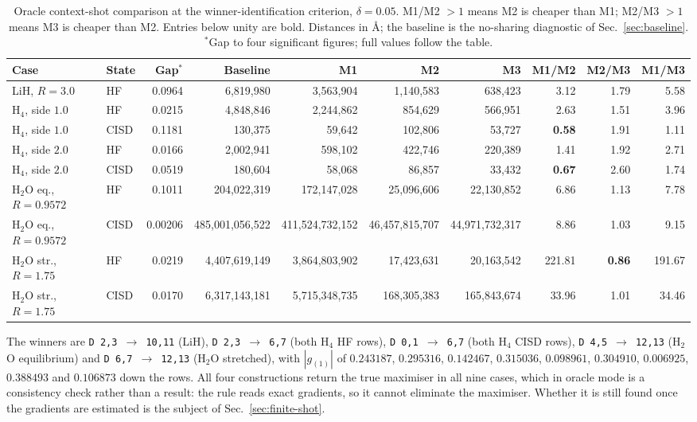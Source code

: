 \documentclass[10pt]{article}
\begin{document}
\begin{table}[!htbp]
\centering
\scriptsize\setlength{\tabcolsep}{3.2pt}
\caption{Oracle context-shot comparison at the winner-identification criterion, $\delta=0.05$. M1/M2 $>1$ means M2 is cheaper than M1; M2/M3 $>1$ means M3 is cheaper than M2. Entries below unity are bold. Distances in \si{\angstrom}; the baseline is the no-sharing diagnostic of Sec.~\ref{sec:baseline}. $^\ast$Gap to four significant figures; full values follow the table.}
\label{tab:completed}
\begin{tabular}{llrrrrrrrr}
\toprule
Case & State & Gap$^\ast$ & Baseline & M1 & M2 & M3 & M1/M2 & M2/M3 & M1/M3 \\
\midrule
LiH, $R{=}3.0$ & HF & 0.0964 & 6,819,980 & 3,563,904 & 1,140,583 & 638,423 & 3.12 & 1.79 & 5.58 \\
H$_4$, side $1.0$ & HF & 0.0215 & 4,848,846 & 2,244,862 & 854,629 & 566,951 & 2.63 & 1.51 & 3.96 \\
H$_4$, side $1.0$ & CISD & 0.1181 & 130,375 & 59,642 & 102,806 & 53,727 & \textbf{0.58} & 1.91 & 1.11 \\
H$_4$, side $2.0$ & HF & 0.0166 & 2,002,941 & 598,102 & 422,746 & 220,389 & 1.41 & 1.92 & 2.71 \\
H$_4$, side $2.0$ & CISD & 0.0519 & 180,604 & 58,068 & 86,857 & 33,432 & \textbf{0.67} & 2.60 & 1.74 \\
H$_2$O eq., $R{=}0.9572$ & HF & 0.1011 & 204,022,319 & 172,147,028 & 25,096,606 & 22,130,852 & 6.86 & 1.13 & 7.78 \\
H$_2$O eq., $R{=}0.9572$ & CISD & 0.00206 & 485,001,056,522 & 411,524,732,152 & 46,457,815,707 & 44,971,732,317 & 8.86 & 1.03 & 9.15 \\
H$_2$O str., $R{=}1.75$ & HF & 0.0219 & 4,407,619,149 & 3,864,803,902 & 17,423,631 & 20,163,542 & 221.81 & \textbf{0.86} & 191.67 \\
H$_2$O str., $R{=}1.75$ & CISD & 0.0170 & 6,317,143,181 & 5,715,348,735 & 168,305,383 & 165,843,674 & 33.96 & 1.01 & 34.46 \\
\bottomrule
\end{tabular}
\end{table}

The winners are \texttt{D 2,3 $\to$ 10,11} (LiH), \texttt{D 2,3 $\to$ 6,7} (both
H$_4$ HF rows), \texttt{D 0,1 $\to$ 6,7} (both H$_4$ CISD rows), \texttt{D 4,5
$\to$ 12,13} (H$_2$O equilibrium) and \texttt{D 6,7 $\to$ 12,13} (H$_2$O
stretched), with $|g_{(1)}|$ of $0.243187$, $0.295316$, $0.142467$, $0.315036$,
$0.098961$, $0.304910$, $0.006925$, $0.388493$ and $0.106873$ down the rows. All
four constructions return the true maximiser in all nine cases, which in oracle
mode is a consistency check rather than a result: the rule reads exact gradients,
so it cannot eliminate the maximiser. Whether it is still found once the
gradients are estimated is the subject of Sec.~\ref{sec:finite-shot}.
\end{document}
